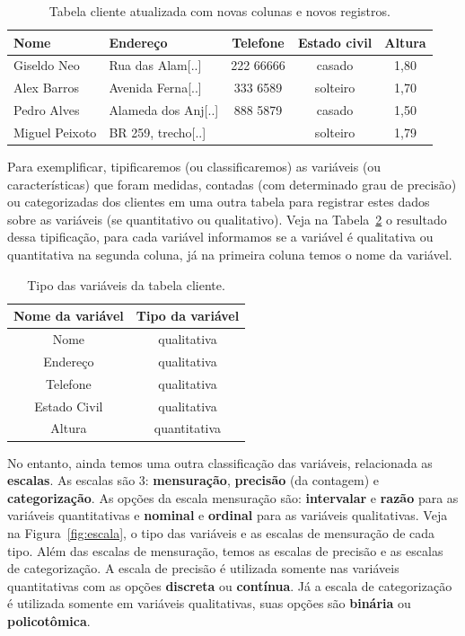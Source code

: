 \documentclass[a4paper,12pt]{book}
\begin{document}
\begin{table}
	\centering
	\caption{Tabela cliente atualizada com novas colunas e novos registros.}
	\begin{tabular}{|l|l|c|c|c|}
	\hline
	\textbf{Nome} & \textbf{Endereço} & \textbf{Telefone} & \textbf{Estado civil} & \textbf{Altura} \\
	\hline
	Giseldo Neo & Rua das Alam[..] & 222 66666 & casado & 1,80\\
	\hline
	Alex Barros & Avenida Ferna[..]& 333 6589 & solteiro & 1,70 \\
	\hline
	Pedro Alves & Alameda dos Anj[..]& 888 5879 & casado & 1,50 \\
	\hline
	Miguel Peixoto & BR 259, trecho[..]&  & solteiro & 1,79 \\
	\hline
	\end{tabular}
	\label{tbl:cliente_v2}
\end{table}

Para exemplificar, tipificaremos (ou classificaremos) as variáveis (ou  características) que foram medidas, contadas (com determinado grau de precisão) ou categorizadas dos clientes em uma outra tabela para registrar estes dados sobre as variáveis (se quantitativo ou qualitativo). Veja na Tabela~\ref{tbl:clienteclassificacao} o resultado dessa tipificação, para cada variável informamos se a variável é qualitativa ou quantitativa na segunda coluna, já na primeira coluna temos o nome da variável.

\begin{table}
	\centering
	\caption{Tipo das variáveis da tabela cliente.}
	\begin{tabular}{|c|c|}
		\hline
		\textbf{Nome da variável} &\textbf{Tipo da variável} \\
		\hline
		Nome & qualitativa \\
		\hline
		Endereço & qualitativa \\
		\hline
		Telefone & qualitativa \\
		\hline
		Estado Civil & qualitativa \\
		\hline
		Altura & quantitativa \\
		\hline
	\end{tabular}
	\label{tbl:clienteclassificacao}
\end{table}

No entanto, ainda temos uma outra classificação das variáveis, relacionada as \textbf{escalas}. As escalas são 3: \textbf{mensuração}, \textbf{precisão} (da contagem) e \textbf{categorização}. As opções da escala mensuração são: \textbf{intervalar} e \textbf{razão} para as variáveis quantitativas e \textbf{nominal} e \textbf{ordinal} para as variáveis qualitativas. Veja na Figura~\ref{fig:escala}, o tipo das variáveis e as escalas de mensuração de cada tipo. Além das escalas de mensuração, temos as escalas de precisão e as escalas de categorização. A escala de precisão é utilizada somente nas variáveis quantitativas com as opções \textbf{discreta} ou \textbf{contínua}. Já a escala de categorização é utilizada somente em variáveis qualitativas, suas opções são \textbf{binária} ou \textbf{policotômica}.
\end{document}
